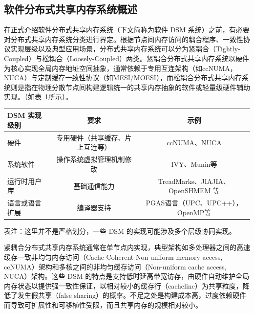 {\subsection{软件分布式共享内存系统概述}
在正式介绍软件分布式共享内存系统（下文简称为软件 DSM 系统）之前，有必要对分布式共享内存系统分类进行界定。根据节点间内存访问的耦合程序、一致性协议实现层级以及典型应用场景，分布式共享内存系统可以分为紧耦合（Tightly-Coupled）与松耦合（Loosely-Coupled）两类。紧耦合分布式共享内存系统以硬件为核心实现全局内存地址空间抽象，通常依赖于专用互连架构（如ccNUMA，NUCA）与定制缓存一致性协议（如MESI/MOESI），而松耦合分布式共享内存系统则是指在物理分散节点间构建逻辑统一的共享内存抽象的软件或轻量级硬件辅助实现。（如表~\ref{tab:dsm-different-implementations}所示）。

\begin{table}[!htbp]
    \label{tab:dsm-different-implementations}
    \centering
    \footnotesize%
    \setlength{\tabcolsep}{4pt}%
    \renewcommand{\arraystretch}{1.5}%
    \begin{tabular}{lcc}
        \hline
        DSM 实现级别 & 要求 & 示例\\
        \hline
        硬件 & 专用硬件（共享缓存、片上互连等）& ccNUMA、NUCA\\
        系统软件 & 操作系统虚拟管理机制修改 & IVY、Munin等 \\
         运行时用户库 & 基础通信能力 & TreadMarks、JIAJIA、OpenSHMEM 等\\
        语言或语言扩展 & 编译器支持 & PGAS语言（UPC、UPC++），OpenMP等 \\
        \hline
    \end{tabular}

    \vspace*{3ex}
    
    \begin{minipage}{\textwidth}%
	\mdseries\par\setlength\hangindent{2\ccwd} 表注：这里并不是严格划分，一些 DSM 的实现可能涉及多个层级协同实现。
    \end{minipage}
\end{table}

紧耦合分布式共享内存系统通常在单节点内实现，典型架构如多处理器之间的高速缓存一致非均匀内存访问（Cache Coherent Non-uniform memory access, ccNUMA）架构和多核之间的非均匀缓存访问（Non-uniform cache access, NUCA）架构。这些 DSM 的特点是支持低时延高带宽访存，由硬件自动维护全局内存状态以提供强一致性保证，以相对较小的缓存行（cacheline）为共享粒度，降低了发生假共享（false sharing）的概率。不足之处是构建成本高，过度依赖硬件而导致可扩展性和可移植性受限，而且共享内存的规模相对较小。

}
